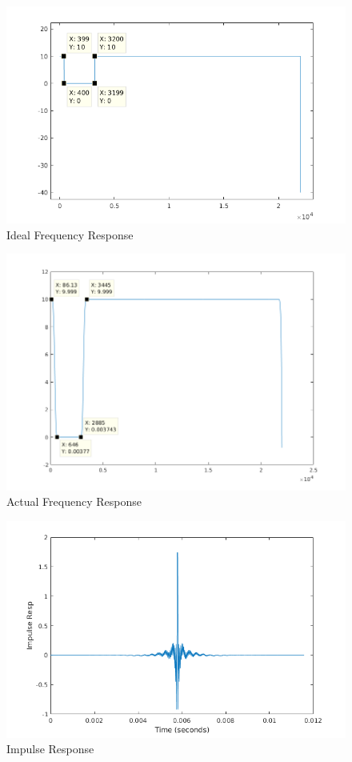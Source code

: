 \documentclass[titlepage]{article}
\begin{document}
\begin{figure}[htbp]
\centering
\includegraphics[width=.9\linewidth]{ideal_fr_a.png}
\caption{Ideal Frequency Response}
\end{figure}

\begin{figure}[htbp]
\centering
\includegraphics[width=.9\linewidth]{fr_a.png}
\caption{Actual Frequency Response}
\end{figure}

\begin{figure}[htbp]
\centering
\includegraphics[width=.9\linewidth]{ir_a.png}
\caption{Impulse Response}
\end{figure}
\end{document}
